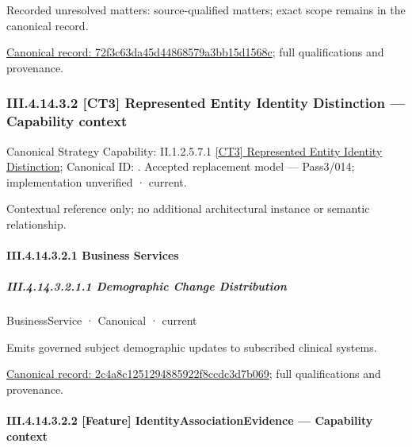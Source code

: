 {\small Recorded unresolved matters: source-qualified matters; exact scope remains in the canonical record.}\par
{\footnotesize \href{../../../../../../../../continuum/business/business-process/72f3c63da45d44868579a3bb15d1568c.md}{Canonical record: 72f3c63da45d44868579a3bb15d1568c}; full qualifications and provenance.}\par
\subsubsection*{III.4.14.3.2 [CT3] Represented Entity Identity Distinction — Capability context}
\label{navigation:III.4.14.3.2}

{\small Canonical Strategy Capability: II.1.2.5.7.1 \hyperref[element:d403533b88f243d0aa555a3a7566b5d1]{[CT3] Represented Entity Identity Distinction}; Canonical ID: \texttt{}. Accepted replacement model — Pass3/014; implementation unverified · current.}\par
Contextual reference only; no additional architectural instance or semantic relationship.\par
\paragraph*{III.4.14.3.2.1 Business Services}
\label{navigation:III.4.14.3.2.1}

\subparagraph*{III.4.14.3.2.1.1 Demographic Change Distribution}
\label{navigation:III.4.14.3.2.1.1}

\label{element:2c4a8c1251294885922f8ccdc3d7b069}
{\small BusinessService · Canonical · current}\par

Emits governed subject demographic updates to subscribed clinical systems.


{\footnotesize \href{../../../../../../../../continuum/business/business-service/2c4a8c1251294885922f8ccdc3d7b069.md}{Canonical record: 2c4a8c1251294885922f8ccdc3d7b069}; full qualifications and provenance.}\par
\paragraph*{III.4.14.3.2.2 [Feature] IdentityAssociationEvidence — Capability context}
\label{navigation:III.4.14.3.2.2}


